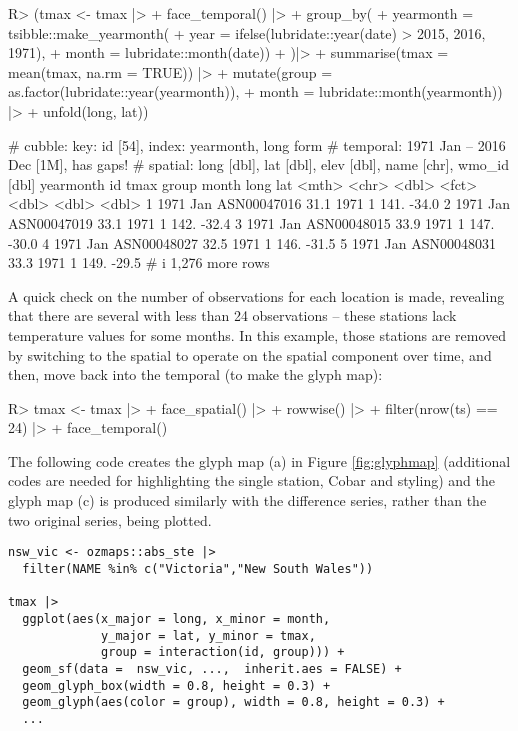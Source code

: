 \documentclass[
  shortnames]{jss}
\begin{document}
\begin{CodeChunk}
\begin{CodeInput}
R> (tmax <- tmax |>
+   face_temporal() |> 
+   group_by(
+     yearmonth = tsibble::make_yearmonth(
+       year = ifelse(lubridate::year(date) > 2015, 2016, 1971),
+       month = lubridate::month(date))
+   )|>
+   summarise(tmax = mean(tmax, na.rm = TRUE)) |> 
+   mutate(group = as.factor(lubridate::year(yearmonth)),
+          month = lubridate::month(yearmonth)) |> 
+   unfold(long, lat))
\end{CodeInput}
\begin{CodeOutput}
# cubble:   key: id [54], index: yearmonth, long form
# temporal: 1971 Jan -- 2016 Dec [1M], has gaps!
# spatial:  long [dbl], lat [dbl], elev [dbl], name [chr], wmo_id [dbl]
  yearmonth id           tmax group month  long   lat
      <mth> <chr>       <dbl> <fct> <dbl> <dbl> <dbl>
1  1971 Jan ASN00047016  31.1 1971      1  141. -34.0
2  1971 Jan ASN00047019  33.1 1971      1  142. -32.4
3  1971 Jan ASN00048015  33.9 1971      1  147. -30.0
4  1971 Jan ASN00048027  32.5 1971      1  146. -31.5
5  1971 Jan ASN00048031  33.3 1971      1  149. -29.5
# i 1,276 more rows
\end{CodeOutput}
\end{CodeChunk}

A quick check on the number of observations for each location is made, revealing that there are several with less than 24 observations -- these stations lack temperature values for some months. In this example, those stations are removed by switching to the spatial  to operate on the spatial component over time, and then, move back into the temporal  (to make the glyph map):

\begin{CodeChunk}
\begin{CodeInput}
R> tmax <- tmax |> 
+   face_spatial() |> 
+   rowwise() |>
+   filter(nrow(ts) == 24) |>
+   face_temporal()
\end{CodeInput}
\end{CodeChunk}

The following code creates the glyph map (a) in Figure \ref{fig:glyphmap} (additional codes are needed for highlighting the single station, Cobar and styling) and the glyph map (c) is produced similarly with the difference series, rather than the two original series, being plotted.

\begin{verbatim}
nsw_vic <- ozmaps::abs_ste |> 
  filter(NAME %in% c("Victoria","New South Wales"))

tmax |> 
  ggplot(aes(x_major = long, x_minor = month, 
             y_major = lat, y_minor = tmax,
             group = interaction(id, group))) + 
  geom_sf(data =  nsw_vic, ...,  inherit.aes = FALSE) + 
  geom_glyph_box(width = 0.8, height = 0.3) + 
  geom_glyph(aes(color = group), width = 0.8, height = 0.3) +
  ...
\end{verbatim}
\end{document}
